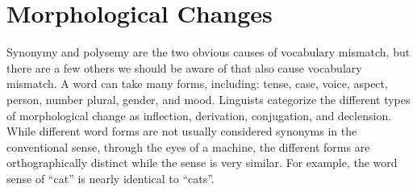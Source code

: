 











\section{Morphological Changes}

Synonymy and polysemy are the two obvious causes of vocabulary mismatch, but there are a few others we should be aware of that also cause vocabulary mismatch. A word can take many forms, including: tense, case, voice, aspect, person, number plural, gender, and mood. Linguists categorize the different types of morphological change as inflection, derivation, conjugation, and declension. While different word forms are not usually considered synonyms in the conventional sense, through the eyes of a machine, the different forms are orthographically distinct while the sense is very similar. For example, the word sense of ``cat'' is nearly identical to ``cats''.


